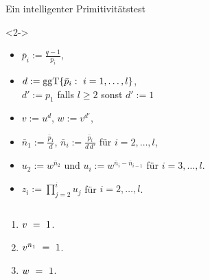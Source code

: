 \documentclass{vorlage}
\begin{document}
\begin{frame}{Ein intelligenter Primitivitätstest}
  \vspace{-0.7cm}
  \begin{minipage}[t]{0.57\textwidth}
  \begin{lemma}<2->\small
    \begin{itemize}
      \item<3-> $\bar p_i := \tfrac{q-1}{p_i}$,
      \item<4-> $d := \ggT\{ \bar p_i:\ i=1,\ldots,l\}$, \\
        $d' := p_1$ falls $l\geq 2$ sonst $d':=1$
      \item<5-> $v := u^d$, \quad $w := v^{d'}$,
      \item<6-> $\bar n_1 := \tfrac{\bar p_1}{d}$, \quad
        $\bar n_i := \tfrac{\bar p_i}{d\, d'}$ für $i=2,\ldots,l$,
      \item<13-> $u_2 := w^{\bar n_2}$ und 
        $u_i := w^{\bar n_i - \bar n_{i-1}}$ für $i=3,\ldots,l$.
      \item<13-> $z_i := \prod_{j=2}^i u_j$ für $i =2,\ldots,l$.
    \end{itemize}
    \begin{columns}
    \begin{column}{0.4\textwidth}
    \begin{enumerate}
      \item<14-> $v \ =\  1$.
      \item<14-> $v^{\bar n_1} \ =\  1$.
      \item<14-> $w \ =\  1$.
    \end{enumerate}
    \end{column}
    \begin{column}{0.5\textwidth}
    \begin{enumerate}

\end{enumerate}
\end{column}
\end{columns}
\end{lemma}
\end{minipage}
\end{frame}
\end{document}
